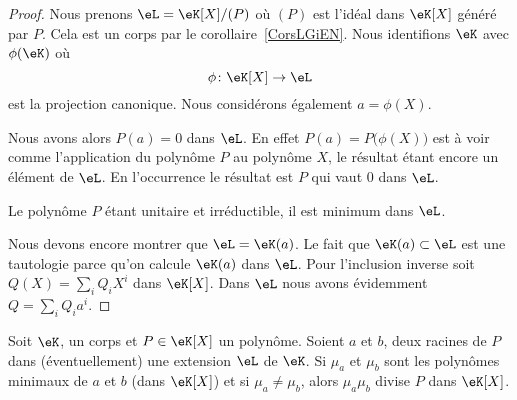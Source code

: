 \begin{proof}
    Nous prenons \( \eL=\eK[X]/(P)\) où \( (P)\) est l'idéal dans \( \eK[X]\) généré par \( P\). Cela est un corps par le corollaire~\ref{CorsLGiEN}. Nous identifions \( \eK\) avec \( \phi(\eK)\) où
    \begin{equation}
        \phi\colon \eK[X]\to \eL
    \end{equation}
    est la projection canonique. Nous considérons également \( a=\phi(X)\).

    Nous avons alors \( P(a)=0\) dans \( \eL\). En effet \( P(a)=P\big( \phi(X) \big)\) est à voir comme l'application du polynôme \( P\) au polynôme \( X\), le résultat étant encore un élément de \( \eL\). En l'occurrence le résultat est \( P\) qui vaut \( 0\) dans \( \eL\).

    Le polynôme \( P\) étant unitaire et irréductible, il est minimum dans \( \eL\).

    Nous devons encore montrer que \( \eL=\eK(a)\). Le fait que \( \eK(a)\subset \eL\) est une tautologie parce qu'on calcule \( \eK(a)\) dans \( \eL\). Pour l'inclusion inverse soit \( Q(X)=\sum_iQ_iX^i\) dans \( \eK[X]\). Dans \( \eL\) nous avons évidemment \( Q=\sum_iQ_ia^i\).
\end{proof}

\begin{proposition} \label{PropyMTEbH}
    Soit \( \eK\), un corps et \( P\in \eK[X]\) un polynôme. Soient \( a\) et \( b\), deux racines de \( P\) dans (éventuellement) une extension \( \eL\) de \( \eK\). Si \( \mu_a\) et \( \mu_b\) sont les polynômes minimaux de \( a\) et \( b\) (dans \( \eK[X]\)) et si \( \mu_a\neq \mu_b\), alors \( \mu_a\mu_b\) divise \( P\) dans \( \eK[X]\).
\end{proposition}

